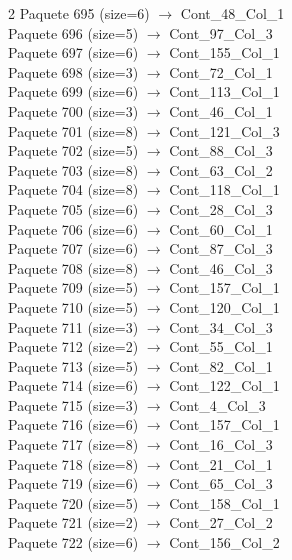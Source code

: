 \begin{multicols}{2}
Paquete 695 (size=6) $\rightarrow$ Cont\_48\_Col\_1\\
Paquete 696 (size=5) $\rightarrow$ Cont\_97\_Col\_3\\
Paquete 697 (size=6) $\rightarrow$ Cont\_155\_Col\_1\\
Paquete 698 (size=3) $\rightarrow$ Cont\_72\_Col\_1\\
Paquete 699 (size=6) $\rightarrow$ Cont\_113\_Col\_1\\
Paquete 700 (size=3) $\rightarrow$ Cont\_46\_Col\_1\\
Paquete 701 (size=8) $\rightarrow$ Cont\_121\_Col\_3\\
Paquete 702 (size=5) $\rightarrow$ Cont\_88\_Col\_3\\
Paquete 703 (size=8) $\rightarrow$ Cont\_63\_Col\_2\\
Paquete 704 (size=8) $\rightarrow$ Cont\_118\_Col\_1\\
Paquete 705 (size=6) $\rightarrow$ Cont\_28\_Col\_3\\
Paquete 706 (size=6) $\rightarrow$ Cont\_60\_Col\_1\\
Paquete 707 (size=6) $\rightarrow$ Cont\_87\_Col\_3\\
Paquete 708 (size=8) $\rightarrow$ Cont\_46\_Col\_3\\
Paquete 709 (size=5) $\rightarrow$ Cont\_157\_Col\_1\\
Paquete 710 (size=5) $\rightarrow$ Cont\_120\_Col\_1\\
Paquete 711 (size=3) $\rightarrow$ Cont\_34\_Col\_3\\
Paquete 712 (size=2) $\rightarrow$ Cont\_55\_Col\_1\\
Paquete 713 (size=5) $\rightarrow$ Cont\_82\_Col\_1\\
Paquete 714 (size=6) $\rightarrow$ Cont\_122\_Col\_1\\
Paquete 715 (size=3) $\rightarrow$ Cont\_4\_Col\_3\\
Paquete 716 (size=6) $\rightarrow$ Cont\_157\_Col\_1\\
Paquete 717 (size=8) $\rightarrow$ Cont\_16\_Col\_3\\
Paquete 718 (size=8) $\rightarrow$ Cont\_21\_Col\_1\\
Paquete 719 (size=6) $\rightarrow$ Cont\_65\_Col\_3\\
Paquete 720 (size=5) $\rightarrow$ Cont\_158\_Col\_1\\
Paquete 721 (size=2) $\rightarrow$ Cont\_27\_Col\_2\\
Paquete 722 (size=6) $\rightarrow$ Cont\_156\_Col\_2\\

\end{multicols}
